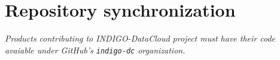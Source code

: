 \section{Repository synchronization}
\footnotesize
\textit{Products contributing to INDIGO-DataCloud project must have their code avaiable under GitHub's \texttt{indigo-dc} organization.}
\\[0.3in]
\normalsize
